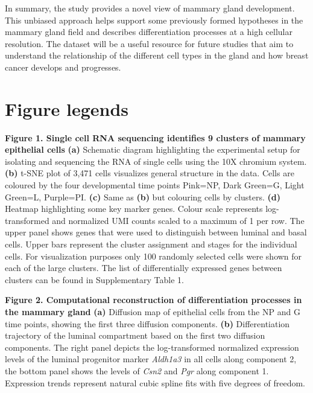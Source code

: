 \documentclass[titlepage, 12pt, oneside]{amsart}
\newcommand{\fakefigure}[1]%
{\refstepcounter{figure}\label{#1}}
\begin{document}
In summary, the study provides a novel view of mammary gland development.
This unbiased approach helps support some previously formed hypotheses in the mammary gland field and describes differentiation processes at a high cellular resolution.
The dataset will be a useful resource for future studies that aim to understand the relationship of the different cell types in the gland and how breast cancer develops and progresses.

\section{Figure legends}

\textbf{Figure 1. Single cell RNA sequencing identifies 9 clusters of
mammary epithelial cells }
\fakefigure{F1}
\textbf{(a)} Schematic diagram highlighting the experimental setup for isolating and sequencing the RNA of single cells using the 10X chromium system.
\textbf{(b)} t-SNE plot of 3,471 cells visualizes general structure in the data.
Cells are coloured by the four developmental time points Pink=NP, Dark Green=G, Light Green=L, Purple=PI.
\textbf{(c)} Same as \textbf{(b)} but colouring cells by clusters.
\textbf{(d)} Heatmap highlighting some key marker genes.
Colour scale represents log-transformed and normalized UMI counts scaled to a maximum of 1 per row.
The upper panel shows genes that were used to distinguish between luminal and basal cells.
Upper bars represent the cluster assignment and stages for the individual cells.
For visualization purposes only 100 randomly selected cells were shown for each of the large clusters.
The list of differentially expressed genes between clusters can be found in Supplementary Table 1.


\textbf{Figure 2. Computational reconstruction of differentiation
processes in the mammary gland}
\fakefigure{F2}
\textbf{(a)} Diffusion map of epithelial cells from the NP and G time points, showing the first three diffusion components.
\textbf{(b)} Differentiation trajectory of the luminal compartment based on the first two diffusion components.
The right panel depicts the log-transformed normalized expression levels of the luminal progenitor marker \textit{Aldh1a3} in all cells along component 2, the bottom panel shows the levels of \textit{Csn2} and \textit{Pgr} along component 1.
Expression trends represent natural cubic spline fits with five degrees of freedom.
\end{document}
